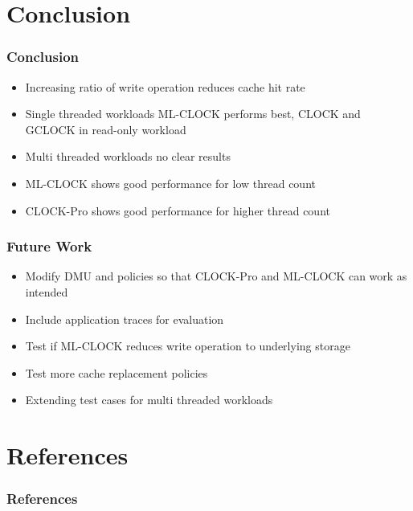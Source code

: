 \documentclass[
	aspectratio=169,
	compress,
]{beamer}
\newcommand{\navframetitle}[1]{\frametitle{#1\hfill{\footnotesize\lastsection{}}}}
\begin{document}
\section{Conclusion}
\label{sec:conclusion}

\begin{frame}
	\navframetitle{Conclusion}

	\begin{itemize}
		\item Increasing ratio of write operation reduces cache hit rate
		\item Single threaded workloads ML-CLOCK performs best, CLOCK and GCLOCK in read-only workload
		\item Multi threaded workloads no clear results
		\item ML-CLOCK shows good performance for low thread count
		\item CLOCK-Pro shows good performance for higher thread count
	\end{itemize}
\end{frame}

\begin{frame}
	\navframetitle{Future Work}
	
	\begin{itemize}
		\item Modify DMU and policies so that CLOCK-Pro and ML-CLOCK can work as intended
		\item Include application traces for evaluation
		\item Test if ML-CLOCK reduces write operation to underlying storage
		\item Test more cache replacement policies
		\item Extending test cases for multi threaded workloads
	\end{itemize}
\end{frame}

\appendix

\AtBeginSection[]{}
\AtBeginSubsection[]{}

\section{References}

\begin{frame}[allowframebreaks]
	\frametitle{References}

	
	
\end{frame}

\end{document}
